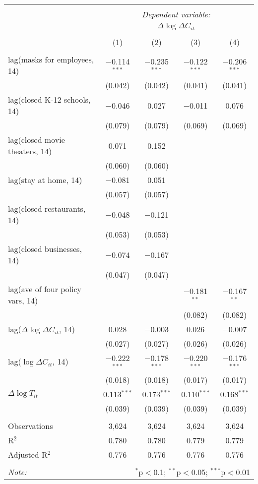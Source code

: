 \begin{tabular}{@{\extracolsep{1pt}}lcccc} 
\\[-1.8ex]\hline 
\hline \\[-1.8ex] 
 & \multicolumn{4}{c}{\textit{Dependent variable:}} \\ 
\cline{2-5} 
 & \multicolumn{4}{c}{$\Delta \log \Delta C_{it}$} \\ 
\\[-1.8ex] & (1) & (2) & (3) & (4)\\ 
\hline \\[-1.8ex] 
 lag(masks for employees, 14) & $-$0.114$^{***}$ & $-$0.235$^{***}$ & $-$0.122$^{***}$ & $-$0.206$^{***}$ \\ 
  & (0.042) & (0.042) & (0.041) & (0.041) \\ 
  lag(closed K-12 schools, 14) & $-$0.046 & 0.027 & $-$0.011 & 0.076 \\ 
  & (0.079) & (0.079) & (0.069) & (0.069) \\ 
  lag(closed movie theaters, 14) & 0.071 & 0.152 &  &  \\ 
  & (0.060) & (0.060) &  &  \\ 
  lag(stay at home, 14) & $-$0.081 & 0.051 &  &  \\ 
  & (0.057) & (0.057) &  &  \\ 
  lag(closed restaurants, 14) & $-$0.048 & $-$0.121 &  &  \\ 
  & (0.053) & (0.053) &  &  \\ 
  lag(closed businesses, 14) & $-$0.074 & $-$0.167 &  &  \\ 
  & (0.047) & (0.047) &  &  \\ 
  lag(ave of four policy vars, 14) &  &  & $-$0.181$^{**}$ & $-$0.167$^{**}$ \\ 
  &  &  & (0.082) & (0.082) \\ 
  lag($\Delta \log \Delta C_{it}$, 14) & 0.028 & $-$0.003 & 0.026 & $-$0.007 \\ 
  & (0.027) & (0.027) & (0.026) & (0.026) \\ 
  lag($\log \Delta C_{it}$, 14) & $-$0.222$^{***}$ & $-$0.178$^{***}$ & $-$0.220$^{***}$ & $-$0.176$^{***}$ \\ 
  & (0.018) & (0.018) & (0.017) & (0.017) \\ 
  $\Delta \log T_{it}$ & 0.113$^{***}$ & 0.173$^{***}$ & 0.110$^{***}$ & 0.168$^{***}$ \\ 
  & (0.039) & (0.039) & (0.039) & (0.039) \\ 
 \hline \\[-1.8ex] 
Observations & 3,624 & 3,624 & 3,624 & 3,624 \\ 
R$^{2}$ & 0.780 & 0.780 & 0.779 & 0.779 \\ 
Adjusted R$^{2}$ & 0.776 & 0.776 & 0.776 & 0.776 \\ 
\hline 
\hline \\[-1.8ex] 
\textit{Note:}  & \multicolumn{4}{r}{$^{*}$p$<$0.1; $^{**}$p$<$0.05; $^{***}$p$<$0.01} \\ 
\end{tabular} 